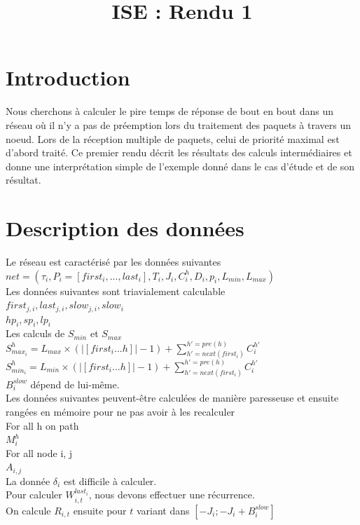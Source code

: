 \documentclass[10pt,a4paper]{article}
\title{ISE : Rendu 1}
\begin{document}
\maketitle

\section{Introduction}
Nous cherchons à calculer le pire temps de réponse de bout en bout dans un réseau où il n'y a pas de préemption lors du traitement des paquets à travers un noeud. Lors de la réception multiple de paquets, celui de priorité maximal est d'abord traité. Ce premier rendu décrit les résultats des calculs intermédiaires et donne une interprétation simple de l'exemple donné dans le cas d'étude et de son résultat.

\section{Description des données}
Le réseau est caractérisé par les données suivantes\\
$net=(\tau_i, P_i = [first_i,...,last_i], T_i, J_i, C_i^h, D_i, p_i, L_{min}, L_{max})$\\

Les données suivantes sont triavialement calculable\\
$first_{j,i}, last_{j,i}, slow_{j,i}, slow_i$\\
$hp_i, sp_i, lp_i$\\

Les calculs de $S_{min}$ et $S_{max}$\\
$S_{max_i}^h = L_{max} \times (|[first_i ... h]| - 1) + \sum 
\limits_{h'=next(first_i)}^{h'=pre(h)}C_i^{h'}$ \\
$S_{min_i}^h = L_{min} \times (|[first_i ... h]| - 1) + \sum 
\limits_{h'=next(first_i)}^{h'=pre(h)}C_i^{h'}$ \\
$B_{i}^{slow}$ dépend de lui-même.\\

Les données suivantes peuvent-être calculées de manière paresseuse et ensuite rangées en mémoire pour ne pas avoir à les recalculer\\
For all h on path\\
$M_i^{h}$\\
For all node i, j\\
$A_{i,j}$\\

La donnée $\delta_i$ est difficile à calculer.\\
Pour calculer $W_{i,t}^{last_i}$, nous devons effectuer une récurrence.\\
On calcule $R_{i,t}$ ensuite pour $t$ variant dans $[-J_i;-J_i+B_i^{slow}]$\\
\end{document}
